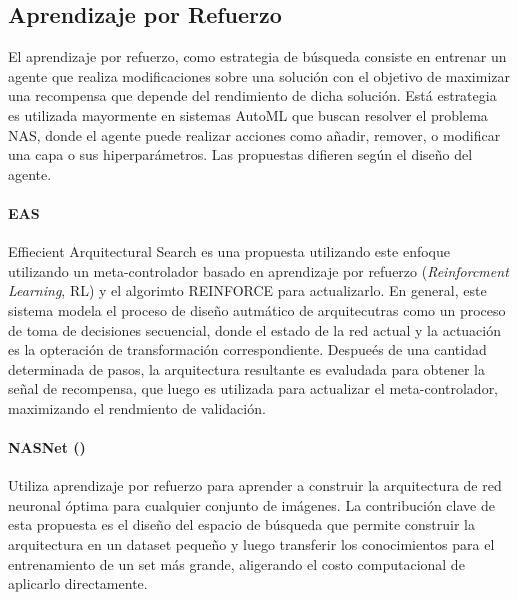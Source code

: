 \subsection{Aprendizaje por Refuerzo}
        El aprendizaje por refuerzo, como estrategia de b\'usqueda consiste en entrenar un agente que realiza modificaciones sobre una soluci\'on con el objetivo de maximizar una recompensa que depende del rendimiento de dicha soluci\'on. Est\'a estrategia es utilizada mayormente en sistemas AutoML que buscan resolver el problema NAS, donde el agente puede realizar acciones como a\~nadir, remover, o modificar una capa o sus hiperpar\'ametros. Las propuestas difieren seg\'un el dise\~no del agente.


        \paragraph*{EAS} Effiecient Arquitectural Search es una propuesta utilizando este enfoque utilizando un meta-controlador basado en aprendizaje por refuerzo (\textit{Reinforcment Learning}, RL) y el algorimto REINFORCE para actualizarlo. En general, este sistema modela el proceso de dise\~no autm\'atico de arquitecutras como un proceso de toma de decisiones secuencial, donde el estado de la red actual y la actuaci\'on es la opteraci\'on de transformaci\'on correspondiente. Despue\'es de una cantidad determinada de pasos, la arquitectura resultante es evaludada para obtener la se\~nal de recompensa, que luego es utilizada para actualizar el meta-controlador, maximizando el rendmiento de validaci\'on.

        \paragraph*{NASNet (\cite{zoph2018learning})} Utiliza aprendizaje por refuerzo para aprender a construir la arquitectura de red neuronal \'optima para cualquier conjunto de im\'agenes. La contribuci\'on clave de esta propuesta es el diseño del espacio de b\'usqueda que permite construir la arquitectura en un dataset peque\~no y luego transferir los conocimientos para el entrenamiento de un set m\'as grande, aligerando el costo computacional de aplicarlo directamente.



